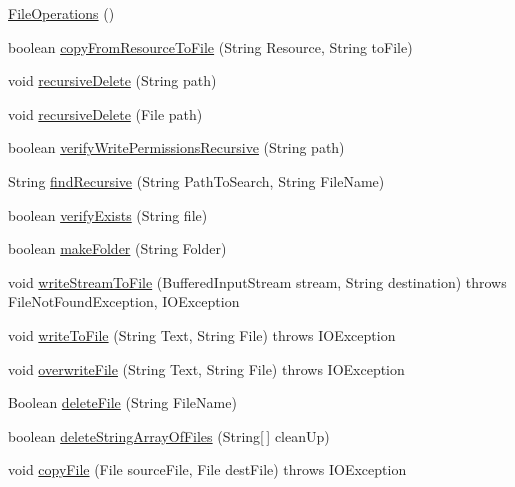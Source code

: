 \begin{DoxyCompactItemize}
\item 
\hyperlink{classCASUAL_1_1FileOperations_aee926f79c6ce0e347940b7a6114ab195}{File\-Operations} ()
\item 
boolean \hyperlink{classCASUAL_1_1FileOperations_a4e114f0c6001493ca5ed892e59276420}{copy\-From\-Resource\-To\-File} (String Resource, String to\-File)
\item 
void \hyperlink{classCASUAL_1_1FileOperations_a8bf6613169e83dee9b70179e1331d99d}{recursive\-Delete} (String path)
\item 
void \hyperlink{classCASUAL_1_1FileOperations_a5fed83c75685ff9516eab0c37658070d}{recursive\-Delete} (File path)
\item 
boolean \hyperlink{classCASUAL_1_1FileOperations_a222a88ab031762c4cc9197c3b6732baa}{verify\-Write\-Permissions\-Recursive} (String path)
\item 
String \hyperlink{classCASUAL_1_1FileOperations_afe29c51ef53af5e44cc4aa61a9a103d0}{find\-Recursive} (String Path\-To\-Search, String File\-Name)
\item 
boolean \hyperlink{classCASUAL_1_1FileOperations_ab8c755446ba87c4ef056cc2b156ee726}{verify\-Exists} (String file)
\item 
boolean \hyperlink{classCASUAL_1_1FileOperations_a2f6eced2a42e01ee23478f3a0448b139}{make\-Folder} (String Folder)
\item 
void \hyperlink{classCASUAL_1_1FileOperations_a76f17b62e1bbc87e3d557643c52e6672}{write\-Stream\-To\-File} (Buffered\-Input\-Stream stream, String destination)  throws File\-Not\-Found\-Exception, I\-O\-Exception 
\item 
void \hyperlink{classCASUAL_1_1FileOperations_a71fbad8531341fe6c2c5212aac13349d}{write\-To\-File} (String Text, String File)  throws I\-O\-Exception 
\item 
void \hyperlink{classCASUAL_1_1FileOperations_a6f67c5c95ce23d0d4163b56eddb8e28f}{overwrite\-File} (String Text, String File)  throws I\-O\-Exception 
\item 
Boolean \hyperlink{classCASUAL_1_1FileOperations_a5b1172ca44af911f74d127cd05bf1f72}{delete\-File} (String File\-Name)
\item 
boolean \hyperlink{classCASUAL_1_1FileOperations_a8e86ea11b79fef56147aba90dc3f4f0f}{delete\-String\-Array\-Of\-Files} (String\mbox{[}$\,$\mbox{]} clean\-Up)
\item 
void \hyperlink{classCASUAL_1_1FileOperations_a95b6013a6610a12798b5a245a741196a}{copy\-File} (File source\-File, File dest\-File)  throws I\-O\-Exception 
\item 

\end{DoxyCompactItemize}
